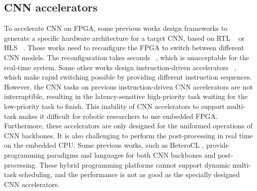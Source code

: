 \subsection{ CNN accelerators }

To accelerate CNN on FPGA, some previous works design frameworks to generate a specific hardware architecture for a target CNN, based on  RTL  ~\cite{li_high_2016} or HLS  ~\cite{lu_evaluating_2017}. These works need to reconfigure the FPGA to switch between different CNN models. The reconfiguration takes seconds  ~\cite{FPGAPerformance}, which is unacceptable for the real-time system.
Some other works design instruction-driven accelerators  ~\cite{yu2018instruction,qiu2016going,guo2017angel,dpu}, which make rapid switching possible by providing different instruction sequences. 
However, the CNN tasks on previous instruction-driven CNN accelerators are not interruptible, resulting in the latency-sensitive high-priority task waiting for the low-priority task to finish. 
This inability of CNN accelerators to support multi-task makes it difficult for robotic researchers to use embedded FPGA. 
Furthermore, these accelerators are only designed for the uniformed operations of CNN backbones. It is also challenging to perform the post-processing in real time on the embedded CPU. 
Some previous works, such as HeteroCL \cite{lai2019heterocl}, provide programming paradigms and languages for both CNN backbones and post-processing. These hybrid programming platforms cannot support dynamic multi-task scheduling, and the performance is not as good as the specially designed CNN accelerators. 

